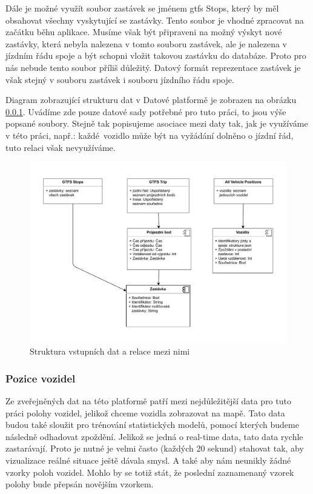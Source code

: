 \bigbreak

Dále je možné využít soubor zastávek se jménem \gls{gtfs} Stops, který by měl obsahovat všechny vyskytující se zastávky. Tento soubor je vhodné zpracovat na začátku běhu aplikace. Musíme však být připraveni na možný výskyt nové zastávky, která nebyla nalezena v tomto souboru zastávek, ale je nalezena v jízdním řádu spoje a být schopni vložit takovou zastávku do databáze. Proto pro nás nebude tento soubor příliš důležitý.  Datový formát reprezentace zastávek je však stejný v souboru zastávek i souboru jízdního řádu spoje.

\bigbreak

Diagram zobrazující strukturu dat v Datové platformě je zobrazen na obrázku \ref{}. Uvádíme zde pouze datové sady potřebné pro tuto práci, to jsou výše popsané soubory. Stejně tak popisujeme asociace mezi daty tak, jak je využíváme v této práci, např.: každé vozidlo může být na vyžádání dolněno o jízdní řád, tuto relaci však nevyužíváme.

\begin{figure}
	\centering
  \includegraphics[width=\linewidth]{../img/relace_vstupnich_dat}
  \caption{Struktura vstupních dat a relace mezi nimi}
  \label{fig:relace_vstupnich_dat}
\end{figure}

\subsubsection{Pozice vozidel}

Ze zveřejněných dat na této platformě patří mezi nejdůležitější data pro tuto práci polohy vozidel, jelikož chceme vozidla zobrazovat na mapě. Tato data budou také sloužit pro trénování statistických modelů, pomocí kterých budeme následně odhadovat zpoždění. Jelikož se jedná o real-time data, tato data rychle zastarávají. Proto je nutné je velmi často (každých 20 sekund) stahovat tak, aby vizualizace reálné situace ještě dávala smysl. A také aby nám neunikly žádné vzorky poloh vozidel. Mohlo by se totiž stát, že poslední zaznamenaný vzorek polohy bude přepsán novějším vzorkem.

